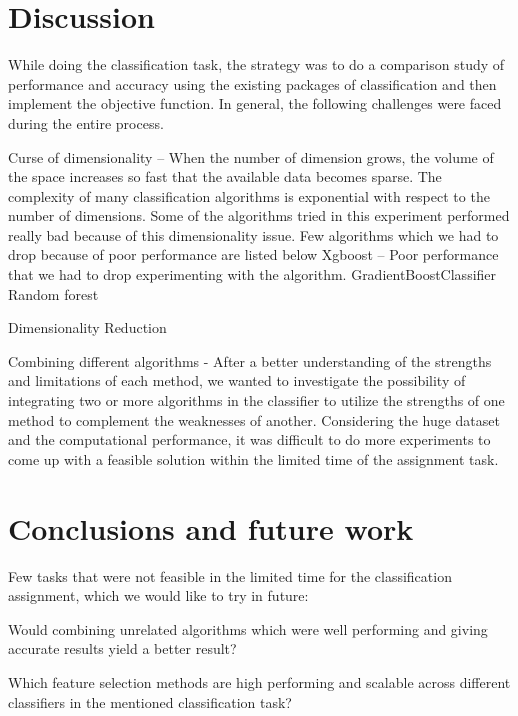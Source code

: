 \documentclass[letterpaper,10pt]{article}
\theoremstyle{mytheor}
\begin{document}
\section{Discussion}

While doing the classification task, the strategy was to do a comparison study of performance and accuracy using the existing packages of classification and then implement the objective function. In general, the following challenges were faced during the entire process.

Curse of dimensionality – When the number of dimension grows, the volume of the space increases so fast that the available data becomes sparse. The complexity of many classification algorithms is exponential with respect to the number of dimensions. Some of the algorithms tried in this experiment performed really bad because of this dimensionality issue. Few algorithms which we had to drop because of poor performance are listed below
Xgboost – Poor performance that we had to drop experimenting with the algorithm.
GradientBoostClassifier
Random forest 

Dimensionality Reduction


Combining different algorithms - After a better understanding of the strengths and limitations of each method, we wanted to investigate the possibility of integrating two or more algorithms in the classifier to utilize the strengths of one method to complement the weaknesses of another. Considering the huge dataset and the computational performance, it was difficult to do more experiments to come up with a feasible solution within the limited time of the assignment task.


\section{Conclusions and future work}

Few tasks that were not feasible in the limited time for the classification assignment, which we would like to try in future:

Would combining unrelated algorithms which were well performing and giving accurate results yield a better result?

Which feature selection methods are high performing and scalable across different classifiers in the mentioned classification task? 


\nocite{wiki:fscore}
\nocite{wiki:pandr}
\nocite{wiki:stat} 
\nocite{wiki:curse}


\end{document}
